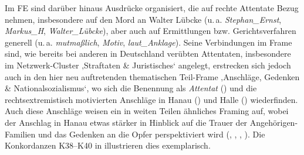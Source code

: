 Im FE  sind darüber hinaus Ausdrücke organisiert, die auf rechte Attentate Bezug nehmen, insbesondere auf den Mord an Walter Lübcke (u.\,a. \emph{Stephan\_Ernst}, \emph{Markus\_H}, \emph{Walter\_Lübcke}), aber auch auf Ermittlungen bzw. Gerichtsverfahren generell (u.\,a. \emph{mutmaßlich}, \emph{Motiv}, \emph{laut\_Anklage}). Seine Verbindungen im Frame sind, wie bereits bei anderen in Deutschland verübten Attentaten, insbesondere im Netzwerk-Cluster ‚Straftaten \& Juristisches` angelegt, erstrecken sich jedoch auch in den hier neu auftretenden thematischen Teil-Frame ‚Anschläge, Gedenken \& Nationalsozialismus`, wo sich die Benennung als \emph{Attentat} () und die rechtsextremistisch motivierten Anschläge in Hanau () und Halle () wiederfinden. Auch diese Anschläge weisen ein in weiten Teilen ähnliches Framing auf, wobei der Anschlag in Hanau etwas stärker in Hinblick auf die Trauer der Angehörigen-Familien und das Gedenken an die Opfer perspektiviert wird (, , , ). Die Konkordanzen K38--K40 in  illustrieren dies exemplarisch.

